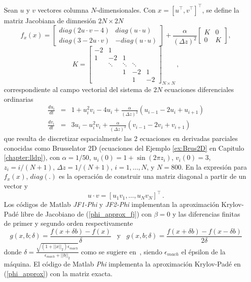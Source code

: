 	 Sean $u$ y $v$ vectores columna $N$-dimensionales. Con $x=[u^{\intercal}, v^{\intercal}]^{\intercal}$, se define la matriz Jacobiana de dimnesión $2N\times2N$
	\begin{equation} \label{ej:ej1-hpfj}
	f_{x}(x)=\left[ 
	\begin{array}{cc}
	diag(2u\cdot v-4) & diag(u\cdot u) \\ 
	diag(3-2u\cdot v) & -diag(u\cdot u)%
	\end{array}%
	\right] +\frac{\alpha }{(\Delta z)^{2}}\left[ 
	\begin{array}{cc}
	K & 0 \\ 
	0 & K%
	\end{array}%
	\right] ,
	\end{equation}
	\[
	K=\left[ 
	\begin{array}{ccccc}
	-2 & 1 &  &  & \\
	1 & -2 & 1 &  &  \\
	& \ddots  & \ddots  & \ddots  &  \\
	&  & 1 & -2 & 1 \\
	&  &  & 1 & -2%
	\end{array}%
	\right]_{N\times N} \, ,
	\]
	correspondiente al campo vectorial del sistema de $2N$ ecuaciones diferenciales ordinarias
	\begin{eqnarray*}
		\frac{du_{i}}{dt} &=&1+u_{i}^{2}v_{i}-4u_{i}+\frac{\alpha }{(\Delta z)^{2}}%
		(u_{i-1}-2u_{i}+u_{i+1}) \\
		\frac{dv_{i}}{dt} &=&3u_{i}-u_{i}^{2}v_{i}+\frac{\alpha }{(\Delta z)^{2}}%
		(v_{i-1}-2v_{i}+v_{i+1})
	\end{eqnarray*}
	que resulta de discretizar espacialmente las 2 ecuaciones en derivadas parciales conocidas como Brusselator 2D (ecuaciones del Ejemplo \ref{ex:Brus2D} en Capitulo \ref{chapter:lldp}), con $\alpha =1/50$, $u_{i}(0)=1+\sin (2\pi z_{i})$, $v_{i}(0)=3$, $z_{i}=i/(N+1)$, $\Delta z =1/(N+1)$, $i=1,\ldots,N$, y $N=800$. En la expresión para $f_x(x)$, $diag(.)$ es la operación de construir una matriz diagonal a partir de un vector y	
	\[  u \cdot v = [ u_1v_1, \ldots, u_Nv_N]^{\intercal}\, . \]
Los códigos de Matlab \textit{JF1-Phi} y \textit{JF2-Phi} implementan la aproximación Krylov-Padé libre de Jacobiano de (\ref{phi_approx_fj}) con $\beta=0$ y las diferencias finitas de primer y segundo orden respectivamente
\begin{equation}\label{finite-differences}
	g(x,b;\delta)=\frac{f(x+\delta b)-f(x)}{\delta}  \;\;\; \text{y} \;\;\; g(x,b;\delta)=\frac{f(x+\delta b)-f(x-\delta b)}{2\delta}
\end{equation}
donde $\delta= \frac{\sqrt{(1+||x||_2)\epsilon_{mach}}}{\epsilon_{mach}+||b||_2}$ como se sugiere en~\cite{knoll2004jacobian}, siendo $\epsilon_{mach}$ el épsilon de la máquina. El código de Matlab \textit{Phi} implementa la aproximación Krylov-Padé en (\ref{phi_approx}) con la matriz exacta.

